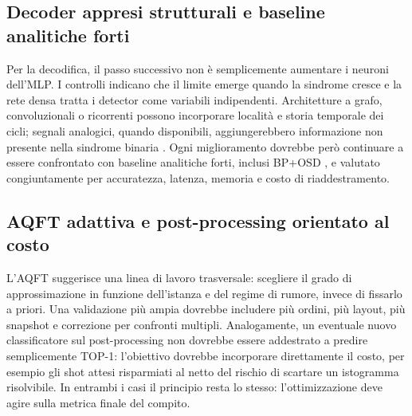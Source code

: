 \subsection{Decoder appresi strutturali e baseline analitiche forti}\label{sec:finale_6_4_4}

Per la decodifica, il passo successivo non è semplicemente aumentare i neuroni dell'MLP. I controlli indicano che il limite emerge quando la sindrome cresce e la rete densa tratta i detector come variabili indipendenti. Architetture a grafo, convoluzionali o ricorrenti possono incorporare località e storia temporale dei cicli; segnali analogici, quando disponibili, aggiungerebbero informazione non presente nella sindrome binaria \cite{alphaqubit2024,torlaiMelko2017,yan2026}. Ogni miglioramento dovrebbe però continuare a essere confrontato con baseline analitiche forti, inclusi BP+OSD \cite{roffe2020,panteleev2021}, e valutato congiuntamente per accuratezza, latenza, memoria e costo di riaddestramento.

\subsection{AQFT adattiva e post-processing orientato al costo}\label{sec:finale_6_4_5}

L'AQFT suggerisce una linea di lavoro trasversale: scegliere il grado di approssimazione in funzione dell'istanza e del regime di rumore, invece di fissarlo a priori. Una validazione più ampia dovrebbe includere più ordini, più layout, più snapshot e correzione per confronti multipli. Analogamente, un eventuale nuovo classificatore sul post-processing non dovrebbe essere addestrato a predire semplicemente TOP-1: l'obiettivo dovrebbe incorporare direttamente il costo, per esempio gli shot attesi risparmiati al netto del rischio di scartare un istogramma risolvibile. In entrambi i casi il principio resta lo stesso: l'ottimizzazione deve agire sulla metrica finale del compito.

